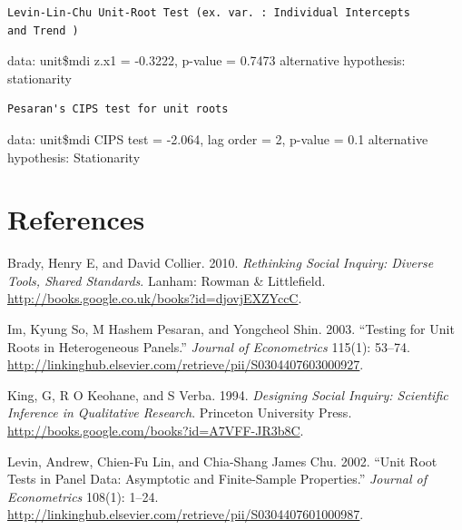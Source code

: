 \documentclass[11pt,article,oneside]{memoir}
\begin{document}
\begin{verbatim}
Levin-Lin-Chu Unit-Root Test (ex. var. : Individual Intercepts
and Trend )
\end{verbatim}

data: unit\$mdi z.x1 = -0.3222, p-value = 0.7473 alternative hypothesis:
stationarity

\begin{verbatim}
Pesaran's CIPS test for unit roots
\end{verbatim}

data: unit\$mdi CIPS test = -2.064, lag order = 2, p-value = 0.1
alternative hypothesis: Stationarity

\pagebreak   

\section*{References}\label{references}

\setlength{\parindent}{-0.2in} \setlength{\leftskip}{0.2in}
\setlength{\parskip}{8pt} \vspace*{-0.2in} \noindent

Brady, Henry E, and David Collier. 2010. \emph{Rethinking Social
Inquiry: Diverse Tools, Shared Standards}. Lanham: Rowman \&
Littlefield. \url{http://books.google.co.uk/books?id=djovjEXZYccC}.

Im, Kyung So, M Hashem Pesaran, and Yongcheol Shin. 2003. ``Testing for
Unit Roots in Heterogeneous Panels.'' \emph{Journal of Econometrics}
115(1): 53--74.
\url{http://linkinghub.elsevier.com/retrieve/pii/S0304407603000927}.

King, G, R O Keohane, and S Verba. 1994. \emph{Designing Social Inquiry:
Scientific Inference in Qualitative Research}. Princeton University
Press. \url{http://books.google.com/books?id=A7VFF-JR3b8C}.

Levin, Andrew, Chien-Fu Lin, and Chia-Shang James Chu. 2002. ``Unit Root
Tests in Panel Data: Asymptotic and Finite-Sample Properties.''
\emph{Journal of Econometrics} 108(1): 1--24.
\url{http://linkinghub.elsevier.com/retrieve/pii/S0304407601000987}.
\end{document}

